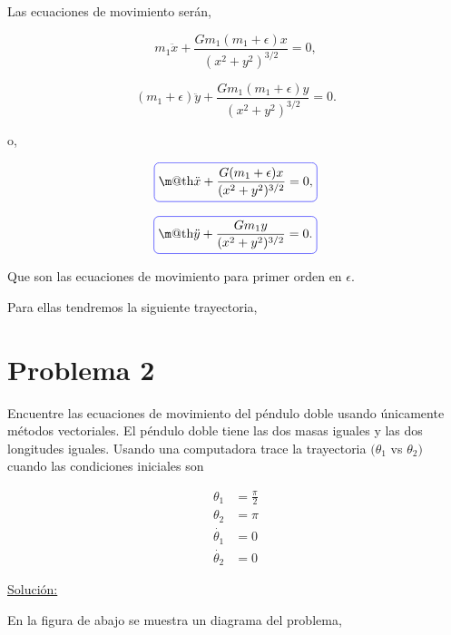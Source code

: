 \documentclass[a4paper,10pt]{article}
\makeatletter
\numberwithin{equation}{section}
\newcommand*{\boxcolor}{blue}
\renewcommand{\boxed}[1]{\textcolor{\boxcolor}{%
\tikz[baseline={([yshift=-1ex]current bounding box.center)}] \node [rectangle, minimum width=1ex,rounded corners,draw] {\normalcolor\m@th$\displaystyle#1$};}}
\makeatother
\begin{document}
Las ecuaciones de movimiento serán,

\begin{equation}
 m_1 \ddot{x} + \frac{G m_1 (m_1 + \epsilon) x}{(x^2+y^2)^{3/2}} = 0,
\end{equation}

\begin{equation}
 (m_1 + \epsilon) \ddot{y} + \frac{G m_1 (m_1 + \epsilon) y}{(x^2+y^2)^{3/2}} = 0.
\end{equation}


o,

\begin{equation}
\boxed{\ddot{x} + \frac{G (m_1 + \epsilon) x}{(x^2+y^2)^{3/2}} = 0,}
\end{equation}

\begin{equation}
 \boxed{\ddot{y} + \frac{G m_1 y}{(x^2+y^2)^{3/2}} = 0.}
\end{equation}

Que son las ecuaciones de movimiento para primer orden en $\epsilon$.

\vspace{.3cm}

Para ellas tendremos la siguiente trayectoria,



\section{Problema 2}

Encuentre las ecuaciones de movimiento del péndulo doble usando únicamente métodos 
vectoriales. El péndulo doble tiene las dos masas iguales y las dos longitudes iguales.
Usando una computadora trace la trayectoria $(\theta_1$ vs $\theta_2)$ cuando las 
condiciones iniciales son

\begin{align*}
 \theta_1 &= \frac{\pi}{2} \\
 \theta_2 &= \pi \\
 \dot{\theta_1} &= 0 \\
 \dot{\theta_2} &= 0 
\end{align*}

\vspace{.3cm}

\underline{Solución:} \vspace{.3cm}

En la figura de abajo se muestra un diagrama del problema, 
\end{document}
